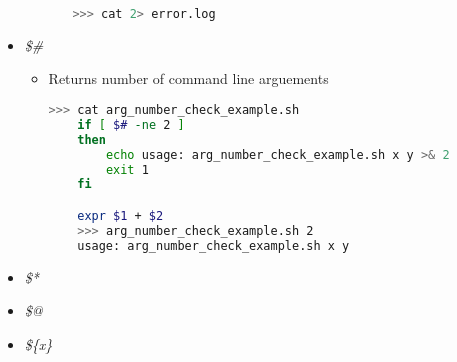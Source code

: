 \documentclass[12pt]{article}
\begin{document}
\begin{itemize}
\begin{itemize}
\begin{itemize}
    \begin{lstlisting}[language=bash]
    >>> cat 2> error.log
    \end{lstlisting}
    \end{itemize}

    \end{itemize}
    \item \textit{\$\#}
    \begin{itemize}
    \item Returns number of command line arguements

    \begin{lstlisting}[language=bash]
    >>> cat arg_number_check_example.sh
    if [ $# -ne 2 ]
    then
        echo usage: arg_number_check_example.sh x y >& 2
        exit 1
    fi

    expr $1 + $2
    >>> arg_number_check_example.sh 2
    usage: arg_number_check_example.sh x y
    \end{lstlisting}

    \end{itemize}
    \item \textit{\$*}
    \item \textit{\$@}
    \item \textit{\$\{x\}}
\end{itemize}
\end{document}
